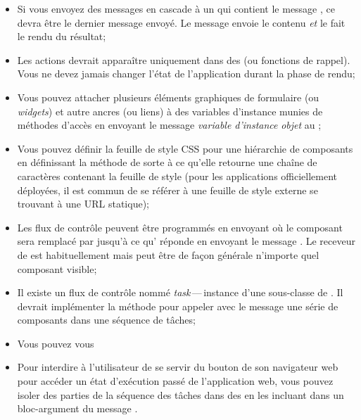 \documentclass[a4paper,10pt,twoside]{book}
\begin{document}
\begin{itemize}
  \item Si vous envoyez des messages en cascade à un \brush qui
    contient le message , ce  devra être le
    dernier message envoyé.
Le message  envoie le contenu \emph{et} le fait le rendu du résultat;
  \item Les actions devrait apparaître uniquement dans des \callbacks
    (ou fonctions de rappel).
Vous ne devez jamais changer l'état de l'application durant la phase de rendu;
  \item Vous pouvez attacher plusieurs éléments graphiques de
    formulaire (ou \emph{widgets}) et autre ancres (ou liens) à des
    variables d'instance munies de méthodes d'accès en envoyant le
    message  \emph{variable d'instance}  \emph{objet}
    au \brush;
  \item Vous pouvez définir la feuille de style CSS pour une
    hiérarchie de composants en définissant la méthode  de
    sorte à ce qu'elle retourne une chaîne de caractères contenant la
    feuille de style (pour les applications officiellement déployées,
    il est commun de se référer à une feuille de style externe se
    trouvant à une URL statique);
  \item Les flux de contrôle
peuvent être programmés en envoyant  où le composant
 sera remplacé par  jusqu'à ce qu' réponde en
envoyant le message  .
Le receveur de  est habituellement  mais peut être
de façon générale n'importe quel composant visible;
  \item Il existe un flux de contrôle
nommé \emph{task}\,---\,instance d'une sous-classe de . Il
devrait implémenter la méthode  pour appeler avec le message
 une série de composants dans une séquence de tâches;
  \item Vous pouvez vous 
  \item Pour interdire à l'utilisateur de se servir du bouton \backbtn
    de son navigateur web pour accéder un état d'exécution passé de
    l'application web, vous pouvez isoler des parties de la séquence
    des tâches dans des \transactions en les incluant dans un
    bloc-argument du message .
\end{itemize}

\ifx\wholebook\relax\else 
   
   
\end{document}

